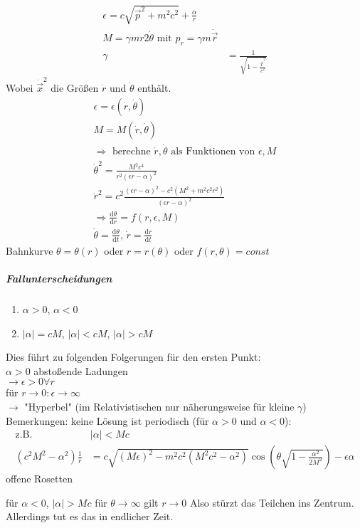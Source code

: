\documentclass[a4paper]{article}
\begin{document}
\begin{align}
\epsilon=c\sqrt{\vec{p}^2+m^2c^2}+\frac{\alpha}{r}\\
M=\gamma mr2\dot{\theta} \text{ mit }p_r=\gamma m \dot{\vec{r}}\\
\gamma&=\frac{1}{\sqrt{1-\frac{\dot{\vec{x}}^2}{c^2}}}
\end{align}
Wobei $\dot{\vec{x}}^2$ die Größen $\dot{r}$ und $\dot{\theta}$ enthält.
\begin{align}
\epsilon=\epsilon(\dot{r},\dot{\theta})\\
M=M(\dot{r},\dot{\theta})\\
\Rightarrow \text{ berechne }\dot{r},\dot{\theta} \text{ als Funktionen von }
\epsilon,M\\
\dot{\theta}^2=\frac{M^2c^4}{r^2(\epsilon r -\alpha)^2}\\
\dot{r}^2=c^2\frac{(\epsilon r -\alpha)^2-c^2(M^2+m^2c^2r^2)}{(\epsilon r
-\alpha)^2}\\
\Rightarrow \frac{\mathrm{d}\theta}{\mathrm{d}r}=f(r,\epsilon,M)\\
\dot{\theta}=\frac{\mathrm{d}\theta}{\mathrm{d}t}\text{,  }\dot{r}=\frac{\mathrm{d}r}{\mathrm{d}t}
\end{align}
Bahnkurve $\theta=\theta(r)$ oder $r=r(\theta)$ oder
$f(r,\theta)=const$\\
\subparagraph{Fallunterscheidungen}
\begin{enumerate}
  \item $\alpha>0$, $\alpha<0$
  \item $|\alpha|=cM$, $|\alpha|<cM$, $|\alpha|>cM$
\end{enumerate}
Dies führt zu folgenden Folgerungen für den ersten Punkt:\\
$\alpha>0$ abstoßende Ladungen\\
$\rightarrow \epsilon>0 \forall r$\\
für $r\rightarrow 0: \epsilon\rightarrow\infty$\\
$\rightarrow$ "Hyperbel" (im Relativistischen nur näherungsweise für kleine
$\gamma$)
Bemerkungen:
keine Lösung ist periodisch (für $\alpha>0$ und $\alpha<0$):
\begin{align}
\text{z.B. } &|\alpha|<Mc\\
(c^2M^2-\alpha^2)\frac{1}{r}&=c\sqrt{(M\epsilon)^2-m^2c^2(M^2c^2-\alpha^2)}
\cos\left(\theta\sqrt{1-\frac{\alpha^2}{2M^2}}\right)-\epsilon\alpha
\end{align}
offene Rosetten

für $\alpha<0$, $|\alpha|>Mc$
für $\theta\rightarrow\infty$ gilt $r\rightarrow0$
Also stürzt das Teilchen ins Zentrum. Allerdings tut es das in endlicher Zeit.
\end{document}
